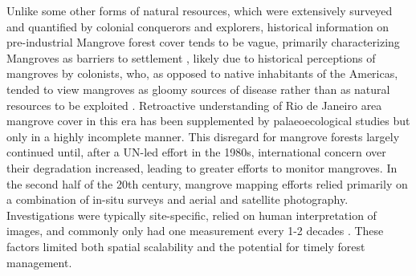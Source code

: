 Unlike some other forms of natural resources, which were extensively surveyed and quantified by colonial conquerors and explorers, historical information on pre-industrial Mangrove forest cover tends to be vague, primarily characterizing Mangroves as barriers to settlement \cite{amadorBaiaGuanabaraOcupacao2013}, likely due to historical perceptions of mangroves by colonists, who, as opposed to native inhabitants of the Americas, tended to view mangroves as gloomy sources of disease rather than as natural resources to be exploited \cite{friessEcosystemServicesDisservices2016}. Retroactive understanding of Rio de Janeiro area mangrove cover in this era has been supplemented by palaeoecological studies \cite{vilelaLateHoloceneEvolution2014} but only in a highly incomplete manner. This disregard for mangrove forests largely continued until, after a UN-led effort in the 1980s, international concern over their degradation increased, leading to greater efforts to monitor mangroves. In the second half of the 20th century, mangrove mapping efforts relied primarily on a combination of in-situ surveys and aerial and satellite photography. Investigations were typically site-specific, relied on human interpretation of images, and commonly only had one measurement every 1-2 decades \cite{lacerdaluizandmenezesmarceloandmussimolisanimauricioChangesMangroveExtension2007, fromardHalfCenturyDynamic2004}. These factors limited both spatial scalability and the potential for timely forest management. 

